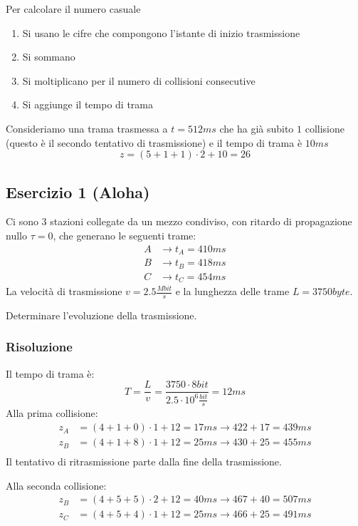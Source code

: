 \documentclass[a4paper]{article}
\begin{document}
\vspace{1em}
\noindent
Per calcolare il numero casuale 
\begin{enumerate}
  \item Si usano le cifre che compongono l'istante di inizio trasmissione
  \item Si sommano
  \item Si moltiplicano per il numero di collisioni consecutive
  \item Si aggiunge il tempo di trama
\end{enumerate}
\begin{example}
  Consideriamo una trama trasmessa a \( t = 512ms \) che ha già subito \( 1 \) collisione
  (questo è il secondo tentativo di trasmissione) e il tempo di trama è \( 10ms \) 
  \[
  z = (5+1+1) \cdot 2 + 10 = 26
  \] 
\end{example}

\subsection{Esercizio 1 (Aloha)}
Ci sono 3 stazioni collegate da un mezzo condiviso, con ritardo di propagazione nullo
\( \tau = 0 \), che generano le seguenti trame:
\[
\begin{aligned}
  A &\to t_A = 410ms\\
  B &\to t_B = 418ms\\
  C &\to t_C = 454ms
\end{aligned}
\] 
La velocità di trasmissione \( v = 2.5 \frac{Mbit}{s} \) e la lunghezza delle trame
\( L = 3750byte \).

\vspace{1em}
\noindent
Determinare l'evoluzione della trasmissione.

\subsubsection{Risoluzione}
Il tempo di trama è:
\[
  T = \frac{L}{v} = \frac{3750 \cdot 8bit}{2.5 \cdot 10^6 \frac{bit}{s}} = 12ms
\]
\label{10-12-esD1}
Alla prima collisione:
\[
  \begin{aligned}
    z_A &= (4+1+0) \cdot 1 + 12 = 17ms \to 422 + 17 = 439ms\\
    z_B &= (4+1+8) \cdot 1 + 12 = 25ms \to 430 + 25 = 455ms\\
  \end{aligned}
\] 
Il tentativo di ritrasmissione parte dalla fine della trasmissione.

Alla seconda collisione:
\[
\begin{aligned}
  z_B &= (4+5+5) \cdot 2 + 12 = 40ms \to 467 + 40 = 507ms\\
  z_C &= (4+5+4) \cdot 1 + 12 = 25ms \to 466 + 25 = 491ms
\end{aligned}
\] 
\end{document}
